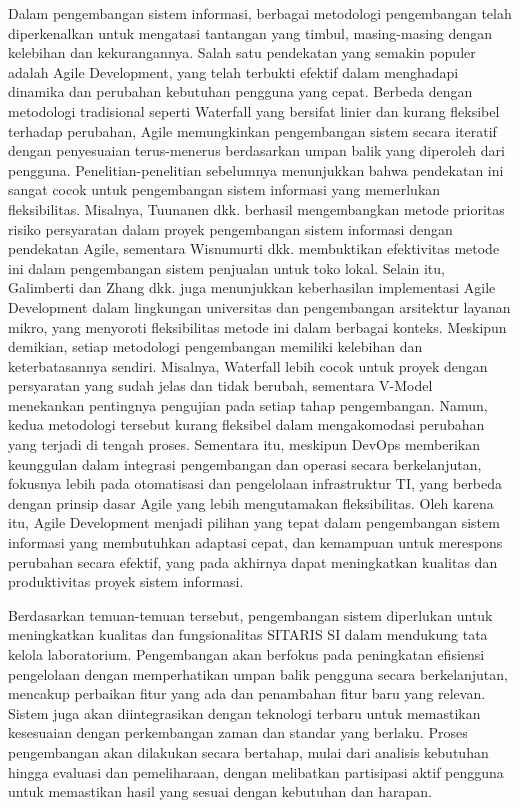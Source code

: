 Dalam pengembangan sistem informasi, berbagai metodologi pengembangan telah diperkenalkan untuk mengatasi tantangan yang timbul, masing-masing dengan kelebihan dan kekurangannya. Salah satu pendekatan yang semakin populer adalah Agile Development, yang telah terbukti efektif dalam menghadapi dinamika dan perubahan kebutuhan pengguna yang cepat. Berbeda dengan metodologi tradisional seperti Waterfall yang bersifat linier dan kurang fleksibel terhadap perubahan, Agile memungkinkan pengembangan sistem secara iteratif dengan penyesuaian terus-menerus berdasarkan umpan balik yang diperoleh dari pengguna. Penelitian-penelitian sebelumnya menunjukkan bahwa pendekatan ini sangat cocok untuk pengembangan sistem informasi yang memerlukan fleksibilitas. Misalnya, Tuunanen dkk. \citeyear{tuunanen2023development} berhasil mengembangkan metode prioritas risiko persyaratan dalam proyek pengembangan sistem informasi dengan pendekatan Agile, sementara Wisnumurti dkk. \citeyear{wisnumurti2022penerapan} membuktikan efektivitas metode ini dalam pengembangan sistem penjualan untuk toko lokal. Selain itu, Galimberti \citeyear{trelles2021agile} dan Zhang dkk. \citeyear{zhang2024establishment} juga menunjukkan keberhasilan implementasi Agile Development dalam lingkungan universitas dan pengembangan arsitektur layanan mikro, yang menyoroti fleksibilitas metode ini dalam berbagai konteks. Meskipun demikian, setiap metodologi pengembangan memiliki kelebihan dan keterbatasannya sendiri. Misalnya, Waterfall lebih cocok untuk proyek dengan persyaratan yang sudah jelas dan tidak berubah, sementara V-Model menekankan pentingnya pengujian pada setiap tahap pengembangan. Namun, kedua metodologi tersebut kurang fleksibel dalam mengakomodasi perubahan yang terjadi di tengah proses. Sementara itu, meskipun DevOps memberikan keunggulan dalam integrasi pengembangan dan operasi secara berkelanjutan, fokusnya lebih pada otomatisasi dan pengelolaan infrastruktur TI, yang berbeda dengan prinsip dasar Agile yang lebih mengutamakan fleksibilitas. Oleh karena itu, Agile Development menjadi pilihan yang tepat dalam pengembangan sistem informasi yang membutuhkan adaptasi cepat, dan kemampuan untuk merespons perubahan secara efektif, yang pada akhirnya dapat meningkatkan kualitas dan produktivitas proyek sistem informasi.

Berdasarkan temuan-temuan tersebut, pengembangan sistem diperlukan untuk meningkatkan kualitas dan fungsionalitas SITARIS SI dalam mendukung tata kelola laboratorium. Pengembangan akan berfokus pada peningkatan efisiensi pengelolaan dengan memperhatikan umpan balik pengguna secara berkelanjutan, mencakup perbaikan fitur yang ada dan penambahan fitur baru yang relevan. Sistem juga akan diintegrasikan dengan teknologi terbaru untuk memastikan kesesuaian dengan perkembangan zaman dan standar yang berlaku. Proses pengembangan akan dilakukan secara bertahap, mulai dari analisis kebutuhan hingga evaluasi dan pemeliharaan, dengan melibatkan partisipasi aktif pengguna untuk memastikan hasil yang sesuai dengan kebutuhan dan harapan.


